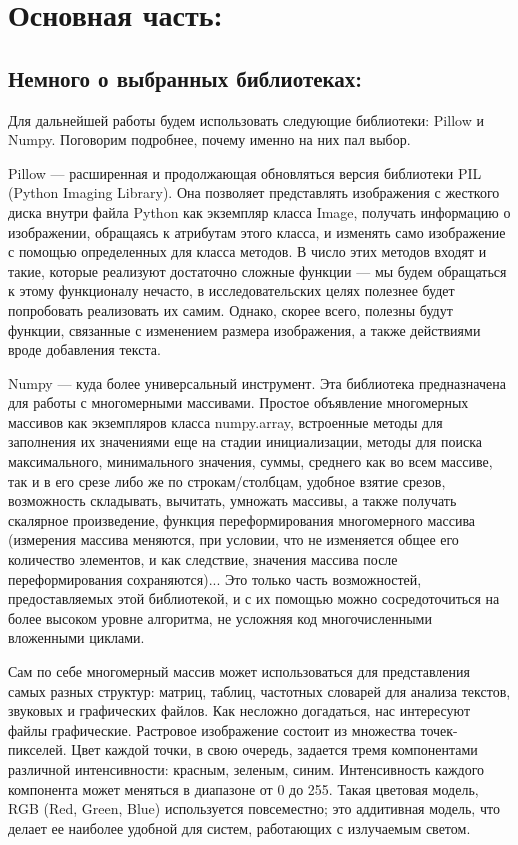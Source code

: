 \documentclass[12pt]{article}
\begin{document}
{	
	\section{Основная часть:}
	\label{main}
	
	\subsection{Немного о выбранных библиотеках:}
	\label{libraries}
	Для дальнейшей работы будем использовать следующие библиотеки: Pillow и Numpy. Поговорим подробнее, почему именно на них пал выбор.
	
	Pillow --- расширенная и продолжающая обновляться версия библиотеки PIL (Python Imaging Library). Она позволяет представлять изображения с жесткого диска внутри файла Python как экземпляр класса Image, получать информацию о изображении, обращаясь к атрибутам этого класса, и изменять само изображение с помощью определенных для класса методов. В число этих методов входят и такие, которые реализуют достаточно сложные функции --- мы будем обращаться к этому функционалу нечасто, в исследовательских целях полезнее будет попробовать реализовать их самим. Однако, скорее всего, полезны будут функции, связанные с изменением размера изображения, а также действиями вроде добавления текста.
	
	Numpy --- куда более универсальный инструмент. Эта библиотека предназначена для работы с многомерными массивами. Простое объявление многомерных массивов как экземпляров класса numpy.array, встроенные методы для заполнения их значениями еще на стадии инициализации, методы для поиска максимального, минимального значения, суммы, среднего как во всем массиве, так и в его срезе либо же по строкам/столбцам, удобное взятие срезов, возможность складывать, вычитать, умножать массивы, а также получать скалярное произведение, функция переформирования многомерного массива (измерения массива меняются, при условии, что не изменяется общее его количество элементов, и как следствие, значения массива после переформирования сохраняются)... Это только часть возможностей, предоставляемых этой библиотекой, и с их помощью можно сосредоточиться на более высоком уровне алгоритма, не усложняя код многочисленными вложенными циклами.
	
	Сам по себе многомерный массив может использоваться для представления самых разных структур: матриц, таблиц, частотных словарей для анализа текстов, звуковых и графических файлов. Как несложно догадаться, нас интересуют файлы графические. Растровое изображение состоит из множества точек-пикселей. Цвет каждой точки, в свою очередь, задается тремя компонентами различной интенсивности: красным, зеленым, синим. Интенсивность каждого компонента может меняться в диапазоне от 0 до 255. Такая цветовая модель, RGB (Red, Green, Blue) используется повсеместно; это аддитивная модель, что делает ее наиболее удобной для систем, работающих с излучаемым светом.
	
}
\end{document}
